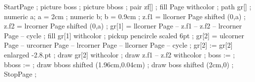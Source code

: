 

\definecolor [a]	       [r=1,g=1,b=.8]
\definecolor [Item]            [r=.2,b=.2,b=.5]
\definecolor [b]               [r=.6,g=.2,b=.2]
\definecolor [c] 	       [r=.7,g=.2,b=.2]
\definecolor [d] 	       [r=.4,g=.2,b=.2]
\definecolor [e] 	       [r=.2,g=.2,b=.5]
\definecolor [f]               [s=.4]

\beginOLDTEX
{} 
\endOLDTEX

\beginLUATEX
{}
\endLUATEX


StartPage ;
picture boss ;
picture bboss ;
pair zf[] ;
fill Page withcolor  ;
path gr[] ;
numeric a; a = 2cm ;
numeric b; b = 0.9cm ;
z.f1 = llcorner Page shifted (0,a) ;
z.f2 = lrcorner Page shifted (0,a) ;
gr[1] = llcorner Page -- z.f1 -- z.f2 -- lrcorner Page -- cycle ;
fill gr[1] withcolor  ;
pickup pencircle scaled 6pt ;
gr[2] = ulcorner Page -- urcorner Page -- lrcorner Page -- llcorner Page -- cycle ;
gr[2] := gr[2] enlarged -2.8.pt ;
draw gr[2] withcolor  ;
draw z.f1 -- z.f2 withcolor  ;
boss := \sometxt{\framed[width=\textwidth,height=2cm,offset=0pt,align=right,top=\vss,bottom=\vss,frame=off]{\Emblem \color[c]{Made with \CONTEXT\hfill \pagenumber\ of \lastpage}}} ;
bboss := \sometxt{\framed[width=\textwidth,height=2cm,offset=0pt,align=right,top=\vss,bottom=\vss,frame=off]{\strut\Emblem \color[d]{Made with \CONTEXT\hfill \pagenumber\ of \lastpage}}} ;
draw bboss shifted (1.96cm,0.04cm) ;
draw boss shifted (2cm,0) ; 
StopPage ;
\stopuseMPgraphic





\lecback{\setuplayout[header=10mm]\setupbackgrounds[page][background={yellowbg,slidetitle}]}
\titback{\setuplayout[header=0mm]\setupbackgrounds[page][background={yellowbg}]}
\picback{\setuplayout[header=0mm]\setupbackgrounds[page][background={yellowbg}]}
\noback{\setupbackgrounds[page][background=nobackground]}


\setupcombinations[distance=1.1cm]


\setupitemize[1][inmargin][color=e]

\protect
\stopmodule

\endinput

